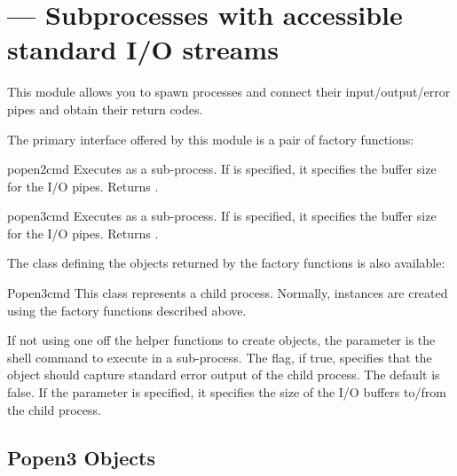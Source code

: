 \section{ ---
         Subprocesses with accessible standard I/O streams}



This module allows you to spawn processes and connect their 
input/output/error pipes and obtain their return codes.

The primary interface offered by this module is a pair of factory
functions:

\begin{funcdesc}{popen2}{cmd}
Executes  as a sub-process.  If  is specified, 
it specifies the buffer size for the I/O pipes.  Returns
.
\end{funcdesc}

\begin{funcdesc}{popen3}{cmd}
Executes  as a sub-process.  If  is specified, 
it specifies the buffer size for the I/O pipes.  Returns
.
\end{funcdesc}

The class defining the objects returned by the factory functions is
also available:

\begin{classdesc}{Popen3}{cmd}
This class represents a child process.  Normally, 
instances are created using the factory functions described above.

If not using one off the helper functions to create 
objects, the parameter  is the shell command to execute in a
sub-process.  The  flag, if true, specifies that
the object should capture standard error output of the child process.
The default is false.  If the  parameter is specified, it
specifies the size of the I/O buffers to/from the child process.
\end{classdesc}


\subsection{Popen3 Objects}
\label{popen3-objects}

